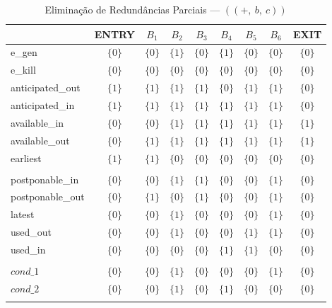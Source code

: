 \begin{table}[ht]
\centering
\begin{tabular}{l|c|c|c|c|c|c|c|c}
	& ENTRY & $B_{1}$ & $B_{2}$ & $B_{3}$ & $B_{4}$ & $B_{5}$ & $B_{6}$ & EXIT \\
\hline
e\_gen & $\{0\}$ & $\{0\}$ & $\{1\}$ & $\{0\}$ & $\{1\}$ & $\{0\}$ & $\{0\}$ & $\{0\}$ \\
e\_kill & $\{0\}$ & $\{0\}$ & $\{0\}$ & $\{0\}$ & $\{0\}$ & $\{0\}$ & $\{0\}$ & $\{0\}$ \\
anticipated\_out & $\{1\}$ & $\{1\}$ & $\{1\}$ & $\{1\}$ & $\{0\}$ & $\{1\}$ & $\{1\}$ & $\{0\}$ \\
anticipated\_in & $\{1\}$ & $\{1\}$ & $\{1\}$ & $\{1\}$ & $\{1\}$ & $\{1\}$ & $\{1\}$ & $\{0\}$ \\
available\_in & $\{0\}$ & $\{0\}$ & $\{1\}$ & $\{1\}$ & $\{1\}$ & $\{1\}$ & $\{1\}$ & $\{1\}$ \\
available\_out & $\{0\}$ & $\{1\}$ & $\{1\}$ & $\{1\}$ & $\{1\}$ & $\{1\}$ & $\{1\}$ & $\{1\}$ \\
earliest & $\{1\}$ & $\{1\}$ & $\{0\}$ & $\{0\}$ & $\{0\}$ & $\{0\}$ & $\{0\}$ & $\{0\}$ \\
 &  &  &  &  &  &  &  &  \\
postponable\_in & $\{0\}$ & $\{0\}$ & $\{1\}$ & $\{1\}$ & $\{0\}$ & $\{0\}$ & $\{1\}$ & $\{0\}$ \\
postponable\_out & $\{0\}$ & $\{1\}$ & $\{0\}$ & $\{1\}$ & $\{0\}$ & $\{0\}$ & $\{1\}$ & $\{0\}$ \\
latest & $\{0\}$ & $\{0\}$ & $\{1\}$ & $\{0\}$ & $\{0\}$ & $\{0\}$ & $\{1\}$ & $\{0\}$ \\
used\_out & $\{0\}$ & $\{0\}$ & $\{1\}$ & $\{0\}$ & $\{0\}$ & $\{1\}$ & $\{1\}$ & $\{0\}$ \\
used\_in & $\{0\}$ & $\{0\}$ & $\{0\}$ & $\{0\}$ & $\{1\}$ & $\{1\}$ & $\{0\}$ & $\{0\}$ \\
 &  &  &  &  &  &  &  &  \\
$cond\_1$ & $\{0\}$ & $\{0\}$ & $\{1\}$ & $\{0\}$ & $\{0\}$ & $\{0\}$ & $\{1\}$ & $\{0\}$ \\
$cond\_2$ & $\{0\}$ & $\{0\}$ & $\{1\}$ & $\{0\}$ & $\{1\}$ & $\{0\}$ & $\{0\}$ & $\{0\}$ \\
\\
\end{tabular}
\caption{Elimina\c{c}\~ao de Redund\^ancias Parciais --- $((+,\:b,\:c))$}
\end{table}



